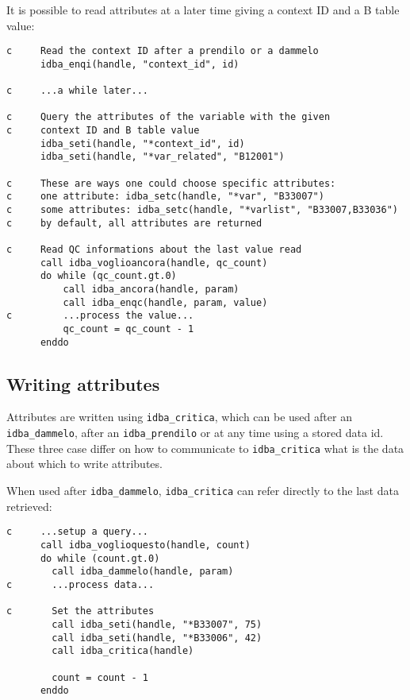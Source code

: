 \documentclass[final,12pt,a4paper,twoside]{book}
\begin{document}
It is possible to read attributes at a later time giving a context ID and a B
table value:

\begin{verbatim}
c     Read the context ID after a prendilo or a dammelo
      idba_enqi(handle, "context_id", id)

c     ...a while later...

c     Query the attributes of the variable with the given
c     context ID and B table value
      idba_seti(handle, "*context_id", id)
      idba_seti(handle, "*var_related", "B12001")

c     These are ways one could choose specific attributes:
c     one attribute: idba_setc(handle, "*var", "B33007")
c     some attributes: idba_setc(handle, "*varlist", "B33007,B33036")
c     by default, all attributes are returned

c     Read QC informations about the last value read
      call idba_voglioancora(handle, qc_count)
      do while (qc_count.gt.0)
          call idba_ancora(handle, param) 
          call idba_enqc(handle, param, value)
c         ...process the value...
          qc_count = qc_count - 1
      enddo
\end{verbatim}

\subsection{Writing attributes}

\label{fun-idba_critica}

Attributes are written using {\tt idba\_critica}, which can be used after an
{\tt idba\_dammelo}, after an {\tt idba\_prendilo} or at any time using a stored data
id.  These three case differ on how to communicate to {\tt idba\_critica} what is
the data about which to write attributes.

When used after {\tt idba\_dammelo}, {\tt idba\_critica} can refer directly to the
last data retrieved:

\begin{verbatim}
c     ...setup a query...
      call idba_voglioquesto(handle, count)
      do while (count.gt.0)
        call idba_dammelo(handle, param)
c       ...process data...

c       Set the attributes
        call idba_seti(handle, "*B33007", 75)
        call idba_seti(handle, "*B33006", 42)
        call idba_critica(handle)

        count = count - 1
      enddo
\end{verbatim}
\end{document}
